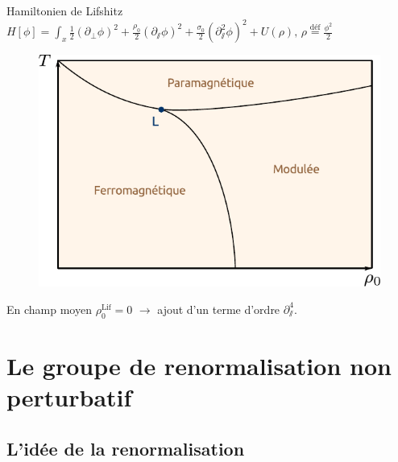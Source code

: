 \documentclass[xcolor=dvipsnames]{beamer}
\newcommand{\p}[1]{\partial_{#1}}
\newcommand{\define}{\ensuremath{ \overset{\text{déf}}{=} }}
\begin{document}
\begin{frame}

\begin{block}{Hamiltonien de Lifshitz}
\centering
$ H[\phi] = \int_x  \frac{1}{2}(\p{\perp} \phi)^2 + \frac{\rho_0}{2}(\p{\sslash}\phi)^2 + \frac{\sigma_0}{2} (\p{\sslash}^2 \phi)^2 + U(\rho) \text{,~} \rho \define \frac{\phi^2}{2}$
\end{block}

\begin{figure}[htp]
\centering
\includegraphics[scale=0.65]{img/phase_diagram.pdf}
\label{}
\end{figure}

En champ moyen $\rho^{\text{Lif}}_0 = 0$ $\rightarrow$ \textcolor{BrickRed}{ajout d'un terme d'ordre $\partial_\sslash^4$}.

\end{frame}

\section{Le groupe de renormalisation non perturbatif}
\subsection{L'idée de la renormalisation}
\end{document}
